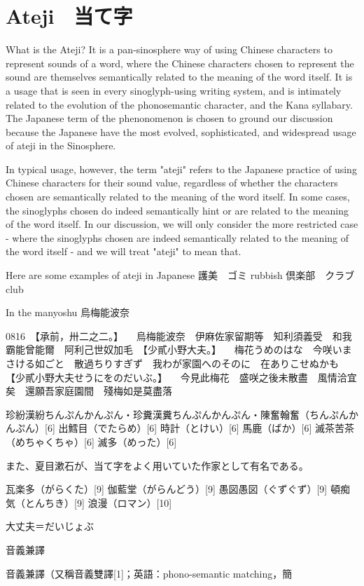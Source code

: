 \section{Ateji　当て字}

What is the Ateji? It is a pan-sinosphere way of using Chinese characters to represent sounds of a word, where the Chinese characters chosen to represent the sound are themselves semantically related to the meaning of the word itself. It is a usage that is seen in every sinoglyph-using writing system, and is intimately related to the evolution of the phonosemantic character, and the Kana syllabary. The Japanese term of the phenonomenon is chosen to ground our discussion because the Japanese have the most evolved, sophisticated, and widespread usage of ateji in the Sinosphere.  

In typical usage, however, the term "ateji" refers to the Japanese practice of using Chinese characters for their sound value, regardless of whether the characters chosen are semantically related to the meaning of the word itself. In some cases, the sinoglyphs chosen do indeed semantically hint or are related to the meaning of the word itself. In our discussion, we will only consider the more restricted case - where the sinoglyphs chosen are indeed semantically related to the meaning of the word itself - and we will treat "ateji" to mean that.

Here are some examples of ateji in Japanese 
護美　ゴミ rubbish
倶楽部　クラブ club

In the manyoshu 
烏梅能波奈

0816　【承前，卅二之二。】
　烏梅能波奈　伊麻佐家留期等　知利須義受　和我霸能曾能爾　阿利己世奴加毛　【少貳小野大夫。】
　梅花うめのはな　今咲いまさける如ごと　散過ちりすぎず　我わが家園へのそのに　在ありこせぬかも　【少貳小野大夫せうにをのだいぶ。】
　今見此梅花　盛咲之後未散盡　風情洽宜矣　還願吾家庭園間　殘梅如是莫盡落

珍紛漢紛ちんぷんかんぷん・珍糞漢糞ちんぷんかんぷん・陳奮翰奮（ちんぷんかんぷん）[6]
出鱈目（でたらめ）[6]
時計（とけい）[6]
馬鹿（ばか）[6]
滅茶苦茶（めちゃくちゃ）[6]
滅多（めった）[6]

また、夏目漱石が、当て字をよく用いていた作家として有名である。

瓦楽多（がらくた）[9]
伽藍堂（がらんどう）[9]
愚図愚図（ぐずぐず）[9]
頓痴気（とんちき）[9]
浪漫（ロマン）[10]


大丈夫＝だいじょぶ

音義兼譯

音義兼譯（又稱音義雙譯[1]；英語：phono-semantic matching，簡

